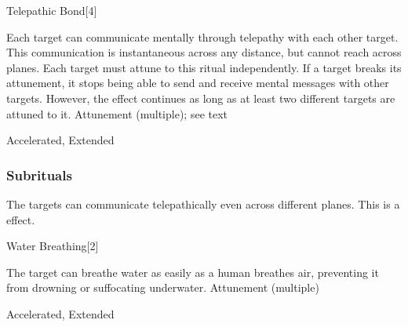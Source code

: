 \begin{spellsection}{Telepathic Bond}[4]
\begin{spellcontent}
\begin{spelltargetinginfo}
\end{spelltargetinginfo}
\begin{spelleffects}
\spelleffect
Each target can communicate mentally through telepathy with each other target.
This communication is instantaneous across any distance, but cannot reach across planes.
Each target must attune to this ritual independently.
If a target breaks its attunement, it stops being able to send and receive mental messages with other targets.
However, the effect continues as long as at least two different targets are attuned to it.
\spelldur Attunement (multiple); see text
\end{spelleffects}
\end{spellcontent}
\begin{spellfooter}
 Accelerated, Extended
\end{spellfooter}
\begin{spellsubcontent}
\end{spellsubcontent}
\end{spellsection}
\subsubsection{Subrituals}
The targets can communicate telepathically even across different planes.
This is a  effect.
\begin{spellsection}{Water Breathing}[2]
\begin{spellcontent}
\begin{spelltargetinginfo}
\end{spelltargetinginfo}
\begin{spelleffects}
\spelleffect
The target can breathe water as easily as a human breathes air, preventing it from drowning or suffocating underwater.
\spelldur Attunement (multiple)
\end{spelleffects}
\end{spellcontent}
\begin{spellfooter}
 Accelerated, Extended
\end{spellfooter}
\begin{spellsubcontent}
\end{spellsubcontent}
\end{spellsection}
